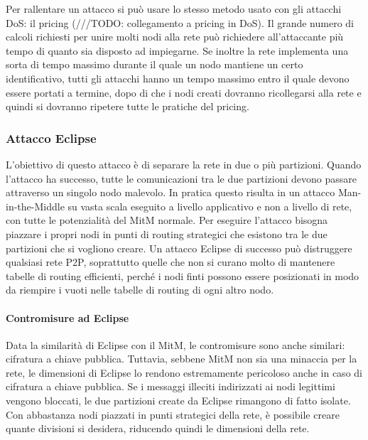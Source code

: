 Per rallentare un attacco si può usare lo stesso metodo usato con gli attacchi DoS: il pricing (///TODO: collegamento a pricing in DoS). Il grande numero di calcoli richiesti per unire molti nodi alla rete può richiedere all'attaccante più tempo di quanto sia disposto ad impiegarne. Se inoltre la rete implementa una sorta di tempo massimo durante il quale un nodo mantiene un certo identificativo, tutti gli attacchi hanno un tempo massimo entro il quale devono essere portati a termine, dopo di che i nodi creati dovranno ricollegarsi alla rete e quindi si dovranno ripetere tutte le pratiche del pricing.

\subsubsection{Attacco Eclipse}\label{attacco-eclipse}

L'obiettivo di questo attacco è di separare la rete in due o più partizioni. Quando l'attacco ha successo, tutte le comunicazioni tra le due partizioni devono passare attraverso un singolo nodo malevolo. In pratica questo risulta in un attacco Man-in-the-Middle su vasta scala eseguito a livello applicativo e non a livello di rete, con tutte le potenzialità del MitM normale. Per eseguire l'attacco bisogna piazzare i propri nodi in punti di routing strategici che esistono tra le due partizioni che si vogliono creare. Un attacco Eclipse di successo può distruggere qualsiasi rete P2P, soprattutto quelle che non si curano molto di mantenere tabelle di routing efficienti, perché i nodi finti possono essere posizionati in modo da riempire i vuoti nelle tabelle di routing di ogni altro nodo.

\paragraph{Contromisure ad Eclipse}\label{contromisure-ad-eclipse}

Data la similarità di Eclipse con il MitM, le contromisure sono anche similari: cifratura a chiave pubblica. Tuttavia, sebbene MitM non sia una minaccia per la rete, le dimensioni di Eclipse lo rendono estremamente pericoloso anche in caso di cifratura a chiave pubblica. Se i messaggi illeciti indirizzati ai nodi legittimi vengono bloccati, le due partizioni create da Eclipse rimangono di fatto isolate. Con abbastanza nodi piazzati in punti strategici della rete, è possibile creare quante divisioni si desidera, riducendo quindi le dimensioni della rete.

